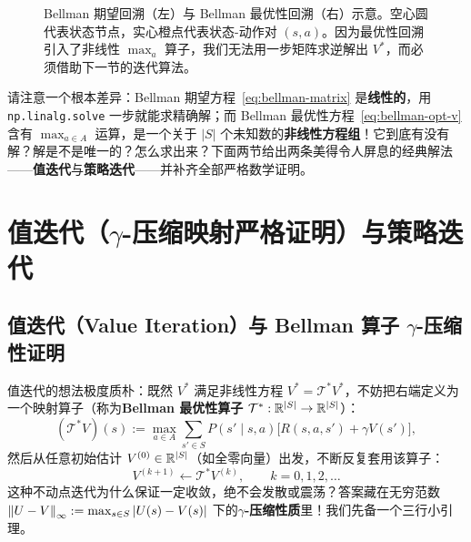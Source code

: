 \begin{figure}[htbp]
\caption{Bellman 期望回溯（左）与 Bellman 最优性回溯（右）示意。空心圆代表状态节点，实心橙点代表状态-动作对 $(s,a)$。因为最优性回溯引入了非线性 $\max_a$ 算子，我们无法用一步矩阵求逆解出 $V^*$，而必须借助下一节的迭代算法。}
\label{fig:backup-diagrams}
\end{figure}

请注意一个根本差异：Bellman 期望方程~\eqref{eq:bellman-matrix} 是\textbf{线性的}，用 \texttt{np.linalg.solve} 一步就能求精确解；而 Bellman 最优性方程~\eqref{eq:bellman-opt-v} 含有 $\max_{a\in A}$ 运算，是一个关于 $|S|$ 个未知数的\textbf{非线性方程组}！它到底有没有解？解是不是唯一的？怎么求出来？下面两节给出两条美得令人屏息的经典解法——\textbf{值迭代}与\textbf{策略迭代}——并补齐全部严格数学证明。

\section{值迭代（$\gamma$-压缩映射严格证明）与策略迭代}\label{sec:vi-pi}

\subsection{值迭代（Value Iteration）与 Bellman 算子 $\gamma$-压缩性证明}

值迭代的想法极度质朴：既然 $V^*$ 满足非线性方程 $V^* = \mathcal{T}^* V^*$，不妨把右端定义为一个映射算子（称为\textbf{Bellman 最优性算子} $\mathcal{T}^*: \mathbb{R}^{|S|} \to \mathbb{R}^{|S|}$）：
\begin{equation}\label{eq:bellman-op}
  (\mathcal{T}^* V)(s) := \max_{a \in A} \sum_{s' \in S} P(s' \mid s, a)\Big[R(s, a, s') + \gamma V(s')\Big],
\end{equation}
然后从任意初始估计 $V^{(0)} \in \mathbb{R}^{|S|}$（如全零向量）出发，不断反复套用该算子：
\[
  V^{(k+1)} \leftarrow \mathcal{T}^* V^{(k)}, \qquad k = 0, 1, 2, \dots
\]
这种不动点迭代为什么保证一定收敛，绝不会发散或震荡？答案藏在无穷范数 $\left\|U - V\right\|_\infty := \max_{s\in S} |U(s) - V(s)|$ 下的\textbf{$\gamma$-压缩性质}里！我们先备一个三行小引理。

